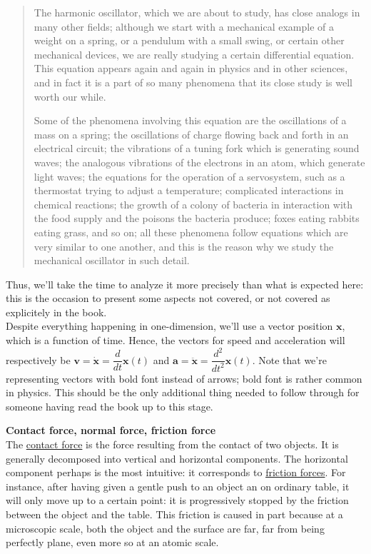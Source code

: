 \documentclass[solutions.tex]{subfiles}
\renewcommand{\bm}[1]{\pmb{#1}}
\begin{document}
\begin{quote}
The harmonic oscillator, which we are about to study, has close analogs in many
other fields; although we start with a mechanical example of a weight on a spring,
or a pendulum with a small swing, or certain other mechanical devices, we are
really studying a certain differential equation. This equation appears again
and again in physics and in other sciences, and in fact it is a part of so
many phenomena that its close study is well worth our while.

Some of the phenomena involving this equation are the oscillations of a
mass on a spring; the oscillations of charge flowing back and forth in
an electrical circuit; the vibrations of a tuning fork which is generating
sound waves; the analogous vibrations of the electrons in an atom, which
generate light waves; the equations for the operation of a servosystem,
such as a thermostat trying to adjust a temperature; complicated
interactions in chemical reactions; the growth of a colony of bacteria
in interaction with the food supply and the poisons the bacteria produce;
foxes eating rabbits eating grass, and so on; all these phenomena follow
equations which are very similar to one another, and this is the reason
why we study the mechanical oscillator in such detail.
\end{quote}

Thus, we'll take the time to analyze it more precisely than what
is expected here: this is the occasion to present some aspects not
covered, or not covered as explicitely in the book. \\

Despite everything happening in one-dimension, we'll use a
vector position $\bm{x}$, which is a function of time. Hence, the vectors
for speed and acceleration will respectively be $\bm{v}=\dot{\bm{x}} =
\dfrac{d}{dt}\bm{x}(t)$ and $\bm{a}=\ddot{\bm{x}} = \dfrac{d^2}{dt^2}\bm{x}(t)$.
Note that we're representing vectors with bold font instead of
arrows; bold font is rather common in physics. This should be the only
additional thing needed to follow through for someone having read the
book up to this stage.

\hr
\textbf{Contact force, normal force, friction force} \\
The \href{https://en.wikipedia.org/wiki/Contact\_force}{contact force}
is the force resulting from the contact of two objects. It is generally decomposed
into vertical and horizontal components. The horizontal component perhaps
is the most intuitive: it corresponds to
\href{https://en.wikipedia.org/wiki/Friction}{friction forces}. For
instance, after having given a gentle push to an object an on ordinary table,
it will only move up to a certain point: it is progressively stopped by
the friction between the object and the table. This friction is caused
in part because at a microscopic scale, both the object and the surface
are far, far from being perfectly plane, even more so at an atomic scale. \\
\end{document}
